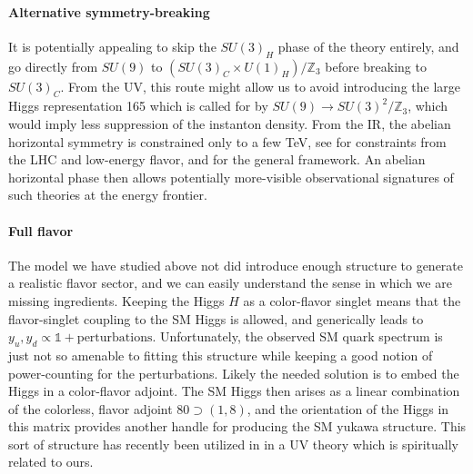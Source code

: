 \documentclass[11pt,a4paper]{article}
\begin{document}
\paragraph{Alternative symmetry-breaking}
It is potentially appealing to skip the $SU(3)_H$ phase of the theory entirely, and go directly from $SU(9)$ to $(SU(3)_C \times U(1)_H) /\mathbb{Z}_3$ before breaking to $SU(3)_C$. 
From the UV, this route might allow us to avoid introducing the large Higgs representation 165 which is called for by $SU(9) \rightarrow SU(3)^2/\mathbb{Z}_3$, which would imply less suppression of the instanton density. 
From the IR, the abelian horizontal symmetry is constrained only to a few TeV, see \cite{Liu:2011dh,Crivellin:2015lwa} for constraints from the LHC and low-energy flavor, and \cite{Langacker:2000ju} for the general framework. An abelian horizontal phase then allows potentially more-visible observational signatures of such theories at the energy frontier.

\paragraph{Full flavor}
The model we have studied above not did introduce enough structure to generate a realistic flavor sector, and we can easily understand the sense in which we are missing ingredients. Keeping the Higgs $H$ as a color-flavor singlet means that the flavor-singlet coupling to the SM Higgs is allowed, and generically leads to $y_u, y_d \propto \mathds{1} + \text{perturbations}$. Unfortunately, the observed SM quark spectrum is just not so amenable to fitting this structure while keeping a good notion of power-counting for the perturbations.
Likely the needed solution is to embed the Higgs in a color-flavor adjoint. The SM Higgs then arises as a linear combination of the colorless, flavor adjoint $80 \supset (1,8)$, and the orientation of the Higgs in this matrix provides another handle for producing the SM yukawa structure. This sort of structure has recently been utilized in \cite{Davighi:2022fer} in a UV theory which is spiritually related to ours. 
\end{document}
